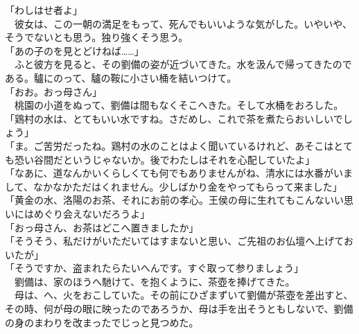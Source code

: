 \documentclass[
  paper=a5,
  fontsize=10pt,
  jafontsize=9.5pt,
  tate,                  %
  open_bracket_pos=nibu, %
]{jlreq}
\begin{document}
「わしはせ者よ」\\


　彼女は、この一朝の満足をもって、死んでもいいような気がした。いやいや、そうでないとも思う。独り強くそう思う。\\


「あの子のを見とどけねば……」\\


　ふと彼方を見ると、その劉備の姿が近づいてきた。水を汲んで帰ってきたのである。驢にのって、驢の鞍に小さい桶を結いつけて。\\


「おお。おっ母さん」\\


　桃園の小道をぬって、劉備は間もなくそこへきた。そして水桶をおろした。\\


「鶏村の水は、とてもいい水ですね。さだめし、これで茶を煮たらおいしいでしょう」\\


「ま。ご苦労だったね。鶏村の水のことはよく聞いているけれど、あそこはとても恐い谷間だというじゃないか。後でわたしはそれを心配していたよ」\\


「なあに、道なんかいくらしくても何でもありませんがね、清水には水番がいまして、なかなかただはくれません。少しばかり金をやってもらって来ました」\\


「黄金の水、洛陽のお茶、それにお前の孝心。王侯の母に生れてもこんないい思いにはめぐり会えないだろうよ」\\


「おっ母さん、お茶はどこへ置きましたか」\\


「そうそう、私だけがいただいてはすまないと思い、ご先祖のお仏壇へ上げておいたが」\\


「そうですか、盗まれたらたいへんです。すぐ取って参りましょう」\\


　劉備は、家のほうへ馳けて、を抱くように、茶壺を捧げてきた。\\


　母は、へ、火をおこしていた。その前にひざまずいて劉備が茶壺を差出すと、その時、何が母の眼に映ったのであろうか、母は手を出そうともしないで、劉備の身のまわりを改まったでじっと見つめた。\\
\end{document}
